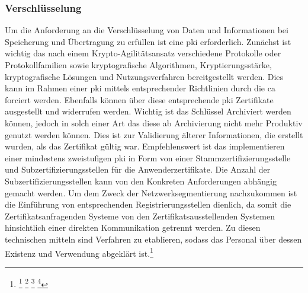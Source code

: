 \documentclass[11pt,a4paper,hidelinks]{article}   %
\begin{document}
            \subsubsection{Verschlüsselung}
            Um die Anforderung an die Verschlüsselung von Daten und Informationen bei Speicherung und Übertragung zu erfüllen ist eine \gls{pki} erforderlich. Zunächst ist wichtig das nach einem Krypto-Agilitätsansatz verschiedene Protokolle oder Protokollfamilien sowie kryptografische Algorithmen, Kryptierungsstärke, kryptografische Lösungen und Nutzungsverfahren bereitgestellt werden. Dies kann im Rahmen einer \gls{pki} mittels entsprechender Richtlinien durch die \gls{ca} forciert werden. Ebenfalls können über diese entsprechende \gls{pki} Zertifikate ausgestellt und widerrufen werden. Wichtig ist das Schlüssel Archiviert werden können, jedoch in solch einer Art das diese ab Archivierung nicht mehr Produktiv genutzt werden können. Dies ist zur Validierung älterer Informationen, die erstellt wurden, als das Zertifikat gültig war. Empfehlenswert ist das implementieren einer mindestens zweistufigen \gls{pki} in Form von einer Stammzertifizierungsstelle und Subzertifizierungsstellen für die Anwenderzertifikate. Die Anzahl der Subzertifizierungsstellen kann von den Konkreten Anforderungen abhängig gemacht werden. Um dem Zweck der Netzwerksegmentierung nachzukommen ist die Einführung von entsprechenden Registrierungsstellen dienlich, da somit die Zertifikatsanfragenden Systeme von den Zertifikatsausstellenden Systemen hinsichtlich einer direkten Kommunikation getrennt werden. Zu diesen technischen mitteln sind Verfahren zu etablieren, sodass das Personal über dessen Existenz und Verwendung abgeklärt ist.\footnote{
                \footcite[Vgl. S. 216 - 218][]{9781498707480}
                \footcite[Vgl. S. 63 - 70][]{9781907117046}
                \footcite[Vgl. S. 23 - 28, 47 - 50][]{9780815396413}
                \footcite[Vgl. S. 293, 302][]{9780763791285}
            }
\end{document}
